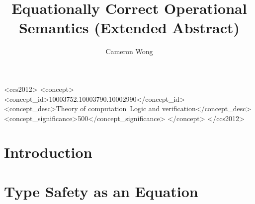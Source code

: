 \documentclass[manuscript,screen,review,sigplan]{acmart}
\begin{document}
\title{Equationally Correct Operational Semantics (Extended Abstract)}

\author{Cameron Wong}

\renewcommand{\shortauthors}{Wong}

\begin{CCSXML}
<ccs2012>
<concept>
<concept_id>10003752.10003790.10002990</concept_id>
<concept_desc>Theory of computation~Logic and verification</concept_desc>
<concept_significance>500</concept_significance>
</concept>
</ccs2012>
\end{CCSXML}


\maketitle

\section{Introduction}

\section{Type Safety as an Equation}
\end{document}
